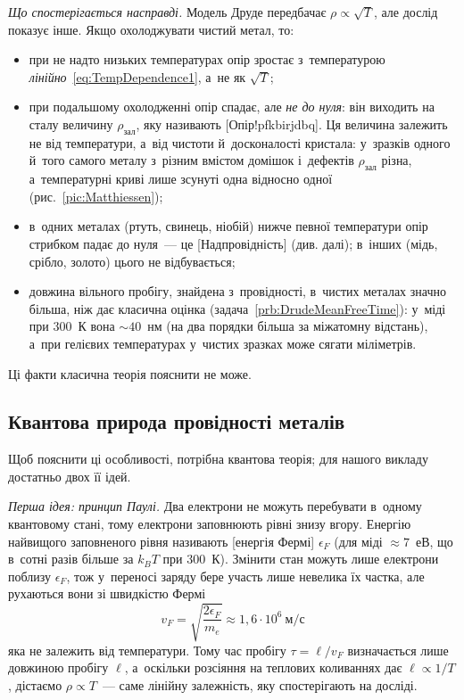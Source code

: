 \emph{Що спостерігається насправді.} Модель Друде передбачає $\rho\propto\sqrt T$, але
дослід показує інше. Якщо охолоджувати чистий метал, то:
\begin{itemize}
	\item при не надто низьких температурах опір зростає з~температурою
	  \emph{лінійно}~\eqref{eq:TempDependence1}, а~не як $\sqrt T$;
	\item при подальшому охолодженні опір спадає, але \emph{не до нуля}: він виходить на
	  сталу величину $\rho_{\text{зал}}$, яку називають [Опір!pfkbirjdbq]. Ця
	  величина залежить не від температури, а~від чистоти й~досконалості кристала:
	  у~зразків одного й~того самого металу з~різним вмістом домішок і~дефектів
	  $\rho_{\text{зал}}$ різна, а~температурні криві лише зсунуті одна відносно одної
	  (рис.~\ref{pic:Matthiessen});
	\item в~одних металах (ртуть, свинець, ніобій) нижче певної температури опір стрибком
	  падає до нуля~--- це [Надпровідність] (див. далі); в~інших (мідь, срібло,
	  золото) цього не відбувається;
	\item довжина вільного пробігу, знайдена з~провідності, в~чистих металах значно
	  більша, ніж дає класична оцінка (задача~\ref{prb:DrudeMeanFreeTime}): у~міді при
	  $300$~К вона $\sim40$~нм (на два порядки більша за міжатомну відстань), а~при
	  гелієвих температурах у~чистих зразках може сягати міліметрів.
\end{itemize}
Ці факти класична теорія пояснити не може.


\subsection*{Квантова природа провідності металів}


Щоб пояснити ці особливості, потрібна квантова теорія; для нашого викладу достатньо двох
її ідей.

\emph{Перша ідея: принцип Паулі.} Два електрони не можуть перебувати в~одному квантовому
стані, тому електрони заповнюють рівні знизу вгору. Енергію найвищого заповненого рівня
називають [енергія Фермі] $\epsilon_F$ (для міді $\approx7$~еВ, що в~сотні разів
більше за $k_BT$ при $300$~К). Змінити стан можуть лише електрони поблизу $\epsilon_F$,
тож у~переносі заряду бере участь лише невелика їх частка, але рухаються вони зі швидкістю
Фермі
\begin{equation}\label{eq:FermiVelocity}
	v_F=\sqrt{\frac{2\epsilon_F}{m_e}}\approx1{,}6\cdot10^{6}\ \text{м/с}
\end{equation}
яка не залежить від температури. Тому час пробігу $\tau=\ell/v_F$ визначається лише
довжиною пробігу $\ell$, а~оскільки розсіяння на теплових коливаннях дає $\ell\propto1/T$,
дістаємо $\rho\propto T$~--- саме лінійну залежність, яку спостерігають на досліді.

